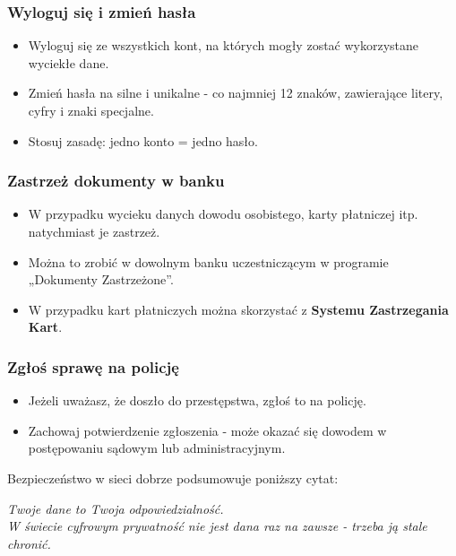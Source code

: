 \subsubsection{Wyloguj się i zmień hasła}
\begin{itemize}
    \item Wyloguj się ze wszystkich kont, na których mogły zostać wykorzystane wyciekłe dane.
    \item Zmień hasła na silne i unikalne - co najmniej 12 znaków, zawierające litery, cyfry i znaki specjalne.
    \item Stosuj zasadę: jedno konto = jedno hasło.
\end{itemize}

\subsubsection{Zastrzeż dokumenty w banku}
\begin{itemize}
    \item W przypadku wycieku danych dowodu osobistego, karty płatniczej itp. natychmiast je zastrzeż.
    \item Można to zrobić w dowolnym banku uczestniczącym w programie „Dokumenty Zastrzeżone”.
    \item W przypadku kart płatniczych można skorzystać z \textbf{Systemu Zastrzegania Kart}.
\end{itemize}

\subsubsection{Zgłoś sprawę na policję}
\begin{itemize}
    \item Jeżeli uważasz, że doszło do przestępstwa, zgłoś to na policję.
    \item Zachowaj potwierdzenie zgłoszenia - może okazać się dowodem w postępowaniu sądowym lub administracyjnym.
\end{itemize}

Bezpieczeństwo w sieci dobrze podsumowuje poniższy cytat:
\begin{center}
\textit{Twoje dane to Twoja odpowiedzialność.\\
W świecie cyfrowym prywatność nie jest dana raz na zawsze - trzeba ją stale chronić.}
\end{center}